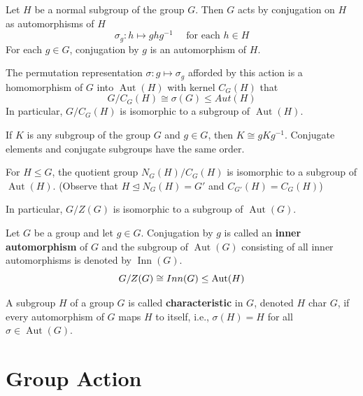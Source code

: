 \begin{proposition}
    Let $H$ be a normal subgroup of the group $G$. Then $G$ acts by conjugation on $H$ as automorphisms of $H$
    \[
        \sigma_g : h \mapsto g h g^{-1} \quad \text { for each } h \in H
    \]
    For each $g \in G$, conjugation by $g$ is an automorphism of $H$.

    The permutation representation $\sigma : g\mapsto \sigma_g$ afforded by this action is a homomorphism of $G$ into $\operatorname{Aut}(H)$ with kernel $C_G(H)$ that
    \[
        G/C_G(H)\cong \sigma(G) \leq {Aut}(H)
    \]
    In particular, $G / C_G(H)$ is isomorphic to a subgroup of $\operatorname{Aut}(H)$.
\end{proposition}

\begin{corollary}
    If $K$ is any subgroup of the group $G$ and $g \in G$, then $K \cong g K g^{-1}$. Conjugate elements and conjugate subgroups have the same order.
\end{corollary}

\begin{corollary}
    For $H \leq G$, the quotient group $N_G(H) / C_G(H)$ is isomorphic to a subgroup of $\operatorname{Aut}(H)$. (Observe that $H\unlhd N_G(H) = G'$ and $C_{G'}(H)= C_G(H)$)

    In particular, $G / Z(G)$ is isomorphic to a subgroup of $\operatorname{Aut}(G)$.
\end{corollary}
\begin{definition}
    Let $G$ be a group and let $g \in G$. Conjugation by $g$ is called an \textbf{inner automorphism} of $G$ and the subgroup of $\operatorname{Aut}(G)$ consisting of all inner automorphisms is denoted by $\operatorname{Inn}(G)$.
    \begin{equation*}
        G/Z(G) \cong {Inn}(G) \leq {\operatorname{\operatorname{Aut}}}(H)
    \end{equation*}
\end{definition}

\begin{definition}
    A subgroup $H$ of a group $G$ is called \textbf{characteristic} in $G$, denoted $H$ char $G$, if every automorphism of $G$ maps $H$ to itself, i.e., $\sigma(H)=H$ for all $\sigma \in \operatorname{Aut}(G)$.
\end{definition}


\chapter{Group Action} %

